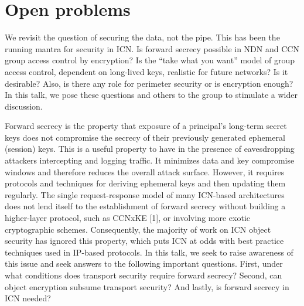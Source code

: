\documentclass[a4paper,UKenglish]{dagrep}
\begin{document}




\section{Open problems}

\license

We revisit the question of securing the data, not the pipe. This has been the running mantra for security in ICN. Is forward secrecy possible in NDN and CCN group access control by encryption? Is the ``take what you want'' model of group access control, dependent on long-lived keys, realistic for future networks? Is it desirable? Also, is there any role for perimeter security or is encryption enough? In this talk, we pose these questions and others to the group to stimulate a wider discussion.

\license

Forward secrecy is the property that exposure of a principal's long-term secret keys does not compromise the secrecy of their previously generated ephemeral (session) keys. This is a useful property to have in the presence of eavesdropping attackers intercepting and logging traffic. It minimizes data and key compromise windows and therefore reduces the overall attack surface. However, it requires protocols and techniques for deriving ephemeral keys and then updating them regularly. The single request-response model of many ICN-based architectures does not lend itself to the establishment of forward secrecy without building a higher-layer protocol, such as CCNxKE [1], or involving more exotic cryptographic schemes. Consequently, the majority of work on ICN object security has ignored this property, which puts ICN at odds with best practice techniques used in IP-based protocols. In this talk, we seek to raise awareness of this issue and seek answers to the following important questions. First, under what conditions does transport security require forward secrecy? Second, can object encryption subsume transport security? And lastly, is forward secrecy in ICN needed?
\end{document}
